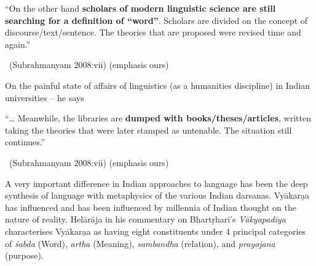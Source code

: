 \begin{myquote}
“On the other hand \textbf{scholars of modern linguistic science are still searching for a definition of “word”}. Scholars are divided on the concept of discourse/text/sentence. The theories that are proposed were revised time and again.”

~\hfill (Subrahmanyam 2008:vii) (emphasis ours)
\end{myquote}

On the painful state of affairs of linguistics (as a humanities discipline) in Indian universities – he says

\begin{myquote}
“… Meanwhile, the libraries are \textbf{dumped with books/theses/articles}, written taking the theories that were later stamped as untenable. The situation still continues.”

~\hfill (Subrahmanyam 2008:vii) (emphasis ours)
\end{myquote}

A very important difference in Indian approaches to language has been the deep synthesis of language with metaphysics of the various Indian darsanas. Vyākarạa has influenced and has been influenced by millennia of Indian thought on the nature of reality. Helārāja in his commentary on Bhartṛhari’s \textit{Vākyapadīya} characterises Vyākarạa as having eight constituents under 4 principal categories of \textit{śabda} (Word), \textit{artha} (Meaning), \textit{sambandha}  (relation), and \textit{prayojana} (purpose).

